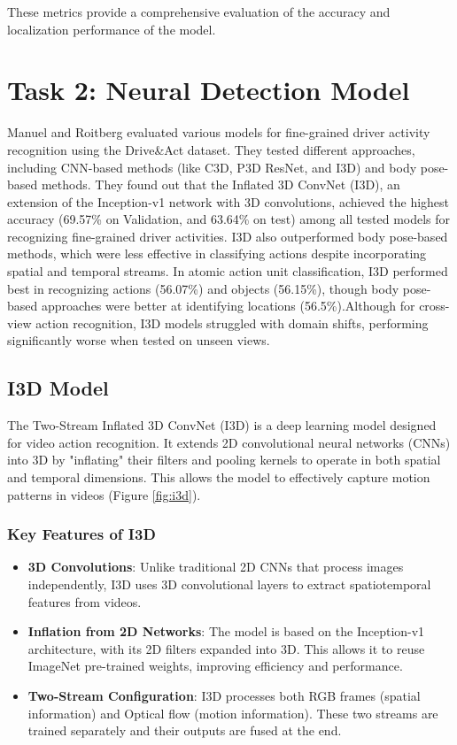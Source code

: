 \documentclass{article}
\begin{document}
These metrics provide a comprehensive evaluation of the accuracy and localization performance of the model.

\section{Task 2: Neural Detection Model}
Manuel and Roitberg \cite{drive_and_act_2019_iccv} evaluated various models for fine-grained driver activity recognition using the Drive\&Act dataset. They tested different approaches, including CNN-based methods (like C3D, P3D ResNet, and I3D) and body pose-based methods. They found out that the Inflated 3D ConvNet (I3D), an extension of the Inception-v1 network with 3D convolutions, achieved the highest accuracy (69.57\% on Validation, and 63.64\% on test) among all tested models for recognizing fine-grained driver activities.
I3D also outperformed body pose-based methods, which were less effective in classifying actions despite incorporating spatial and temporal streams.
In atomic action unit classification, I3D performed best in recognizing actions (56.07\%) and objects (56.15\%), though body pose-based approaches were better at identifying locations (56.5\%).Although for cross-view action recognition, I3D models struggled with domain shifts, performing significantly worse when tested on unseen views.
\subsection{I3D Model}
The Two-Stream Inflated 3D ConvNet (I3D) \cite{carreira2018quovadisactionrecognition} is a deep learning model designed for video action recognition. It extends 2D convolutional neural networks (CNNs) into 3D by "inflating" their filters and pooling kernels to operate in both spatial and temporal dimensions. This allows the model to effectively capture motion patterns in videos (Figure \ref{fig:i3d}).
\subsubsection{Key Features of I3D}
\begin{itemize}
    \item \textbf{3D Convolutions}: Unlike traditional 2D CNNs that process images independently, I3D uses 3D convolutional layers to extract spatiotemporal features from videos.
    \item \textbf{Inflation from 2D Networks}: The model is based on the Inception-v1 architecture, with its 2D filters expanded into 3D. This allows it to reuse ImageNet pre-trained weights, improving efficiency and performance.
    \item \textbf{Two-Stream Configuration}: I3D processes both RGB frames (spatial information) and Optical flow (motion information). These two streams are trained separately and their outputs are fused at the end.
\end{itemize}
\end{document}
